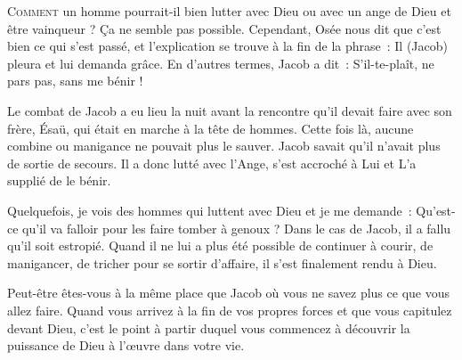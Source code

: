 \dvrule






\lettrine{C}{omment} un homme pourrait-il bien lutter avec Dieu
 \ocadr ou avec un ange de Dieu \fcadr{} et être vainqueur ?
 Ça ne semble pas possible.
 Cependant, Osée nous dit que c'est bien ce qui s'est passé,
 et l'explication se trouve à la fin de la phrase~:
 \Og Il (Jacob) pleura et lui demanda grâce. \Fg{}
 En d'autres termes, Jacob a dit~: 
 \Og S'il-te-plaît, ne pars pas, sans me bénir ! \Fg{}

Le combat de Jacob a eu lieu la nuit avant la rencontre qu'il devait
 faire avec son frère, Ésaü, qui était en marche à la tête de  hommes.
 Cette fois là, aucune combine ou manigance ne pouvait plus le sauver.
 Jacob savait qu'il n'avait plus de sortie de secours.
 Il a donc lutté avec l'Ange, s'est accroché à Lui et L'a supplié de le bénir. 


Quelquefois, je vois des hommes qui luttent avec Dieu et je me demande~: 
 \Og Qu'est-ce qu'il va falloir pour les faire tomber à genoux ? \Fg{}
 Dans le cas de Jacob, il a fallu qu'il soit estropié.
 Quand il ne lui a plus été possible de continuer à courir, de manigancer,
 de tricher pour se sortir d'affaire, il s'est finalement rendu à Dieu. 

Peut-être êtes-vous à la même place que Jacob où vous ne savez plus
 ce que vous allez faire. Quand vous arrivez à la fin de vos propres forces
 et que vous capitulez devant Dieu, c'est le point à partir duquel
 vous commencez à découvrir la puissance de Dieu à l'\oe{}uvre dans votre vie. 

\dvrule



